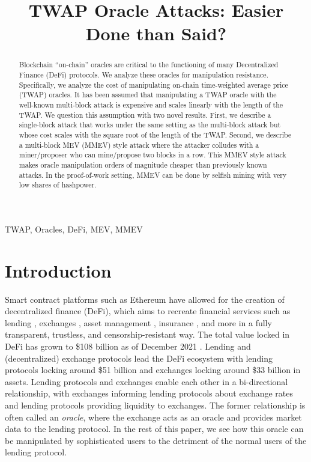 \documentclass[conference]{IEEEtran}
\begin{document}
\title{TWAP Oracle Attacks: Easier Done than Said?}

\author{
\and
{}
\and
{}
}


\maketitle

\begin{abstract}
Blockchain ``on-chain'' oracles are critical to the functioning of many Decentralized Finance (DeFi) protocols. We analyze these oracles for manipulation resistance. Specifically, we analyze the cost of manipulating on-chain time-weighted average price (TWAP) oracles. It has been assumed that manipulating a TWAP oracle with the well-known multi-block attack is expensive and scales linearly with the length of the TWAP. We question this assumption with two novel results. First, we describe a single-block attack that works under the same setting as the multi-block attack but whose cost scales with the square root of the length of the TWAP. Second, we describe a multi-block MEV (MMEV) style attack where the attacker colludes with a miner/proposer who can mine/propose two blocks in a row. This MMEV style attack makes oracle manipulation orders of magnitude cheaper than previously known attacks. In the proof-of-work setting, MMEV can be done by selfish mining with very low shares of hashpower.
\end{abstract}

\begin{IEEEkeywords}
TWAP, Oracles, DeFi, MEV, MMEV
\end{IEEEkeywords}

\section{Introduction}
Smart contract platforms such as Ethereum \cite{wood2014ethereum} have allowed for the creation of decentralized finance (DeFi), which aims to recreate financial services such as lending \cite{leshner2019compound,AaveWhitepaper}, exchanges \cite{Zhang2018UniV1,warren20170x}, asset management \cite{yearn_finance,convex_finance}, insurance \cite{KarpNexusMutual}, and more in a fully transparent, trustless, and censorship-resistant way. The total value locked in DeFi has grown to \$108 billion as of December 2021 \cite{DeFiPulse}. Lending and (decentralized) exchange protocols lead the DeFi ecosystem with lending protocols locking around \$51 billion and exchanges locking around \$33 billion in assets. Lending protocols and exchanges enable each other in a bi-directional relationship, with exchanges informing lending protocols about exchange rates and lending protocols providing liquidity to exchanges. The former relationship is often called an \textit{oracle}, where the exchange acts as an oracle and provides market data to the lending protocol. In the rest of this paper, we see how this oracle can be manipulated by sophisticated users to the detriment of the normal users of the lending protocol.
\end{document}
